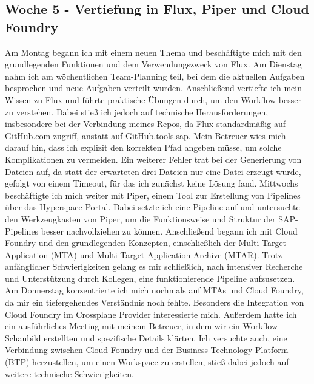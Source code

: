 \subsection{Woche 5 - Vertiefung in Flux, Piper und Cloud Foundry}
Am Montag begann ich mit einem neuen Thema und beschäftigte mich mit den
grundlegenden Funktionen und dem Verwendungszweck von Flux.
Am Dienstag nahm ich am wöchentlichen Team-Planning teil, bei dem die aktuellen
Aufgaben besprochen und neue Aufgaben verteilt wurden. Anschließend vertiefte ich
mein Wissen zu Flux und führte praktische Übungen durch, um den Workflow besser
zu verstehen. Dabei stieß ich jedoch auf technische Herausforderungen,
insbesondere bei der Verbindung meines Repos, da Flux standardmäßig auf
GitHub.com zugriff, anstatt auf GitHub.tools.sap. Mein Betreuer wies mich darauf
hin, dass ich explizit den korrekten Pfad angeben müsse, um solche Komplikationen
zu vermeiden. Ein weiterer Fehler trat bei der Generierung von Dateien auf, da statt
der erwarteten drei Dateien nur eine Datei erzeugt wurde, gefolgt von einem Timeout,
für das ich zunächst keine Lösung fand.
Mittwochs beschäftigte ich mich weiter mit Piper, einem Tool zur Erstellung von
Pipelines über das Hyperspace-Portal. Dabei setzte ich eine Pipeline auf und
untersuchte den Werkzeugkasten von Piper, um die Funktionsweise und Struktur der
SAP-Pipelines besser nachvollziehen zu können. Anschließend begann ich mit Cloud
Foundry und den grundlegenden Konzepten, einschließlich der Multi-Target
Application (MTA) und Multi-Target Application Archive (MTAR). Trotz anfänglicher
Schwierigkeiten gelang es mir schließlich, nach intensiver Recherche und
Unterstützung durch Kollegen, eine funktionierende Pipeline aufzusetzen.
Am Donnerstag konzentrierte ich mich nochmals auf MTAs und Cloud Foundry, da
mir ein tiefergehendes Verständnis noch fehlte. Besonders die Integration von Cloud
Foundry im Crossplane Provider interessierte mich. Außerdem hatte ich ein
ausführliches Meeting mit meinem Betreuer, in dem wir ein Workflow-Schaubild
erstellten und spezifische Details klärten. Ich versuchte auch, eine Verbindung
zwischen Cloud Foundry und der Business Technology Platform (BTP) herzustellen,
um einen Workspace zu erstellen, stieß dabei jedoch auf weitere technische
Schwierigkeiten.

